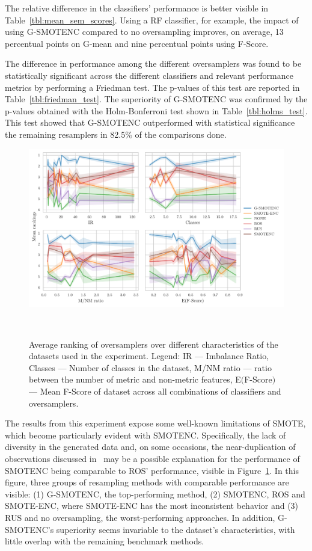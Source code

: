 \documentclass[preprint,12pt]{elsarticle}
\begin{document}
{The relative difference in the classifiers' performance is better visible in
Table~\ref{tbl:mean_sem_scores}. Using a RF classifier, for example, the
impact of using G-SMOTENC compared to no oversampling improves, on
average, 13 percentual points on G-mean and nine percentual points
using F-Score. 

The difference in performance among the different oversamplers was found to be
statistically significant across the different classifiers and relevant
performance metrics by performing a Friedman test. The p-values of this test
are reported in Table~\ref{tbl:friedman_test}. The superiority of G-SMOTENC
was confirmed by the p-values obtained with the Holm-Bonferroni test shown
in Table~\ref{tbl:holms_test}. This test showed that G-SMOTENC outperformed
with statistical significance the remaining resamplers in 82.5\% of the
comparisons done.

\begin{figure}
	\centering
	\includegraphics[width=\linewidth]{../analysis/consistency_analysis_plot}
    \caption{Average ranking of oversamplers over different characteristics of
        the datasets used in the experiment. Legend: IR --- Imbalance Ratio,
        Classes --- Number of classes in the dataset, M/NM ratio --- ratio
        between the number of metric and non-metric features, E$($F-Score$)$
        --- Mean F-Score of dataset across all combinations of classifiers and
        oversamplers.
    }~\label{fig:consistency_analysis}
\end{figure}


The results from this experiment expose some well-known limitations of SMOTE,
which become particularly evident with SMOTENC. Specifically, the lack of
diversity in the generated data and, on some occasions, the near-duplication
of observations discussed in~\cite{douzas2019geometric} may be a possible
explanation for the performance of SMOTENC being comparable to ROS'
performance, visible in Figure~\ref{fig:consistency_analysis}. In this
figure, three groups of resampling methods with comparable performance are
visible: (1) G-SMOTENC, the top-performing method, (2) SMOTENC, ROS and
SMOTE-ENC, where SMOTE-ENC has the most inconsistent behavior and (3) RUS and
no oversampling, the worst-performing approaches. In addition, G-SMOTENC's
superiority seems invariable to the dataset's characteristics, with little
overlap with the remaining benchmark methods.

}
\end{document}
